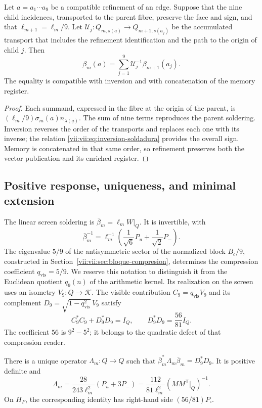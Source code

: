 \begin{proposition}
\label{vii:vii:prop:refinamiento-soldadura}
Let \(a=a_1\cdots a_9\) be a compatible refinement of an edge.
Suppose that the nine child incidences, transported to the parent
fibre, preserve the face and sign, and that
\(\ell_{m+1}=\ell_m/9\). Let
\(\mathcal U_j:Q_{m,s(a)}\longrightarrow Q_{m+1,s(a_j)}\)
be the accumulated transport that includes the refinement identification
and the path to the origin of child \(j\). Then
\[
 \beta_m(a)=
 \sum_{j=1}^{9}\mathcal U_j^{-1}\beta_{m+1}(a_j).
\]
The equality is compatible with inversion and with concatenation
of the memory register.
\end{proposition}

\begin{proof}
Each summand, expressed in the fibre at the origin of the parent, is
\((\ell_m/9)\sigma_m(a)n_{\lambda(\underline a)}\).
The sum of nine terms reproduces the parent soldering.
Inversion reverses the order of the transports and replaces each one
with its inverse; the relation \eqref{vii:vii:eq:inversion-soldadura} provides
the overall sign. Memory is concatenated in that same order, so
refinement preserves both the vector publication and its
enriched register.
\end{proof}

\subsection{Positive response, uniqueness, and minimal extension}
\label{vii:vii:sec:respuesta-positiva}

The linear screen soldering is
\(\bar\beta_m=\ell_mW|_Q\). It is invertible, with
\[
 \bar\beta_m^{-1}
 =\ell_m^{-1}\left(\frac1{\sqrt6}P_u+\frac1{\sqrt2}P_-\right).
\]
The eigenvalue \(5/9\) of the antisymmetric sector of the normalized block
\(B_c/9\), constructed in Section~\ref{vii:vii:sec:bloque-compresion},
determines the compression
coefficient \(q_{\mathrm{vis}}=5/9\). We reserve this notation to
distinguish it from the Euclidean quotient \(q_9(n)\) of the arithmetic kernel.
Its realization on the screen uses an isometry
\(V_9:Q\longrightarrow\mathcal K\). The visible contribution
\(C_9=q_{\mathrm{vis}}V_9\) and its complement
\(D_9=\sqrt{1-q_{\mathrm{vis}}^2}\,V_9\) satisfy
\[
 C_9^*C_9+D_9^*D_9=I_Q,\qquad D_9^*D_9=\frac{56}{81}I_Q.
\]
The coefficient \(56\) is \(9^2-5^2\); it belongs to the quadratic defect
of that compression reader.

\begin{theorem}
\label{vii:vii:thm:respuesta-unica}
There is a unique operator \(\Lambda_m:Q\longrightarrow Q\) such that
\(\bar\beta_m^*\Lambda_m\bar\beta_m=D_9^*D_9\). It is positive definite and
\begin{equation}
 \Lambda_m=\frac{28}{243\ell_m^2}(P_u+3P_-)
 =\frac{112}{81\ell_m^2}
       (MM^{\mathsf T}|_Q)^{-1}.
 \label{vii:vii:eq:lambda-pantalla}
\end{equation}
On \(H_F\), the corresponding identity has right-hand side
\((56/81)P_\square\).
\end{theorem}

